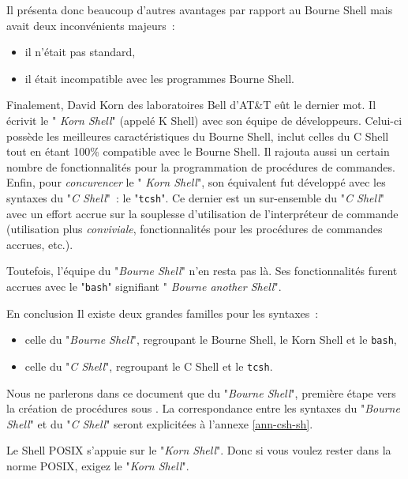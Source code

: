 Il pr{\'e}senta donc beaucoup d'autres avantages par rapport au Bourne Shell mais avait deux 
inconv{\'e}nients majeurs~:
\begin{itemize}
	\item	il n'{\'e}tait pas standard,
	\item	il {\'e}tait incompatible avec les programmes Bourne Shell.
\end{itemize}

Finalement, David {\sc Korn} des laboratoires {\sc Bell} d'AT\&T e{\^u}t
le dernier mot. Il {\'e}crivit le "{\sl
Korn Shell}" (appel{\'e} K Shell) avec son {\'e}quipe de
d{\'e}veloppeurs. Celui-ci poss{\`e}de les meilleures
caract{\'e}ristiques du Bourne Shell, inclut celles du C Shell tout en
{\'e}tant 100\% compatible avec le Bourne Shell. Il rajouta aussi un
certain nombre de fonctionnalit{\'e}s pour la programmation de
proc{\'e}dures de commandes. Enfin, pour {\sl concurencer} le "{\sl
Korn Shell}", son {\'e}quivalent fut d{\'e}velopp{\'e} avec les
syntaxes du "{\sl C Shell}"~: le "{\tt tcsh}". Ce dernier est un
sur-ensemble du "{\sl C Shell}" avec un effort accrue sur la
souplesse d'utilisation de l'interpr{\'e}teur de commande (utilisation
plus {\it conviviale}, fonctionnalit{\'e}s pour les proc{\'e}dures de
commandes accrues, etc.).

Toutefois, l'{\'e}quipe du "{\sl Bourne Shell}" n'en resta pas
l{\`a}. Ses fonctionnalit{\'e}s furent accrues avec le
"{\tt bash}" signifiant "{\sl
Bourne another Shell}".

\begin{definition}{En conclusion}
Il existe deux grandes familles pour les syntaxes~:
\begin{itemize}
	\item	celle du "{\sl Bourne Shell}", regroupant
			le Bourne Shell, le Korn Shell et le {\tt bash},
	\item	celle du "{\sl C Shell}", regroupant
			le C Shell et le {\tt tcsh}.
\end{itemize}
Nous ne parlerons dans ce document que du "{\sl Bourne Shell}",
premi{\`e}re {\'e}tape vers la cr{\'e}ation de proc{\'e}dures sous
{\Unix}. La correspondance entre les syntaxes du "{\sl Bourne
Shell}" et du "{\sl C Shell}" seront explicit{\'e}es {\`a}
l'annexe \ref{ann-csh-sh}.
\end{definition}

\begin{remarque}
Le Shell POSIX s'appuie sur le "{\sl Korn Shell}". Donc si vous
voulez rester dans la norme POSIX, exigez le "{\sl Korn Shell}".
\end{remarque}


